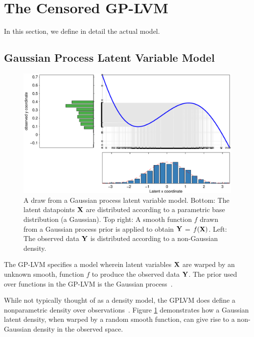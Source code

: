 \documentclass{article}
\begin{document}
\section{The Censored GP-LVM}

In this section, we define in detail the actual model.

\subsection{Gaussian Process Latent Variable Model}

\begin{figure}
\centering
\includegraphics[width=0.8\columnwidth]{figures/gplvm_1d_draw_8} 
\caption{A draw from a Gaussian process latent variable model.  Bottom:  The latent datapoints $\mathbf{X}$ are distributed according to a parametric base distribution (a Gaussian).  Top right:  A smooth function $f$ drawn from a Gaussian process prior is applied to obtain $\mathbf{Y}$ = $f(\mathbf{X})$.  Left:  The observed data $\mathbf{Y}$ is distributed according to a non-Gaussian density.}
\label{fig:gplvm_intro}
\end{figure}

The GP-LVM specifies a model wherein latent variables $\mathbf{X}$ are warped by an unknown smooth, function $f$ to produce the observed data $\mathbf{Y}$.  The prior used over functions in the GP-LVM is the Gaussian process~\cite{rasmussen38gaussian}.

While not typically thought of as a density model, the GPLVM does define a nonparametric density over observations~\cite{nickisch2010gaussian}.   Figure \ref{fig:gplvm_intro} demonstrates how a Gaussian latent density, when warped by a random smooth function, can give rise to a non-Gaussian density in the observed space.
\end{document}
